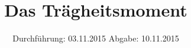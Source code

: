 

\subject{101}
\title{Das Trägheitsmoment}
\date{
  Durchführung: 03.11.2015
  \hspace{3em}
  Abgabe: 10.11.2015
}



\maketitle
\thispagestyle{empty}
\tableofcontents
\newpage






\printbibliography


